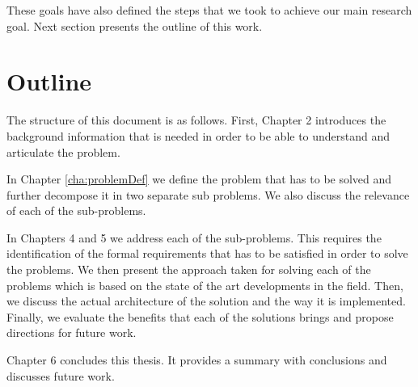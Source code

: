 These goals have also defined the steps that we took to achieve our main research goal. Next section presents the outline of this work.


\section{Outline}
The structure of this document is as follows. First, Chapter 2 introduces the background information that is needed in order to be able to understand and articulate the problem.

In Chapter \ref{cha:problemDef} we define the problem that has to be solved and further decompose it in two separate sub problems. We also discuss the relevance of each of the sub-problems.

In Chapters 4 and 5 we address each of the sub-problems. This requires the identification of the formal requirements that has to be satisfied in order to solve the problems. We then present the approach taken for solving each of the problems which is based on the state of the art developments in the field. Then, we discuss the actual architecture of the solution and the way it is implemented. Finally, we evaluate the benefits that each of the solutions brings and propose directions for future work. 

Chapter 6 concludes this thesis. It provides a summary with conclusions and discusses future work.